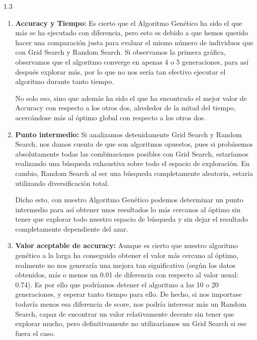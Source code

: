 \documentclass{article}
\begin{document}
\begin{spacing}{1.3}
\begin{enumerate}
  \item \textbf{Accuracy y Tiempo: }Es cierto que el Algoritmo Genético ha sido el que más se ha ejecutado con diferencia,
  pero esto es debido a que hemos querido hacer una comparación justa para evaluar el mismo número de 
  individuos que con Grid Search y Random Search. Si observamos la primera gráfica, observamos que el algoritmo
  converge en apenas 4 o 5 generaciones, para así después explorar más, por lo que no nos sería tan efectivo
  ejecutar el algoritmo durante tanto tiempo.

  No solo eso, sino que además ha sido el que ha encontrado el mejor valor de Accuracy con respecto a los otros dos,
  alrededor de la mitad del tiempo, acercándose más al óptimo global con respecto a los otros dos.\newline

  \item \textbf{Punto intermedio: }Si analizamos detenidamente Grid Search y Random Search, nos damos cuenta de que 
  son algoritmos opuestos, pues si probásemos absolutamente todas las combinaciones posibles con Grid Search, estaríamos
  realizando una búsqueda exhaustiva sobre todo el espacio de exploración. En cambio, Random Search al ser una búsqueda 
  completamente aleatoria, estaría utilizando diversificación total.

  Dicho esto, con nuestro Algoritmo Genético podemos determinar un punto intermedio para así obtener unos resultados lo 
  más cercanos al óptimo sin tener que explorar todo nuestro espacio de búsqueda y sin dejar el resultado completamente 
  dependiente del azar.\newline

  \item \textbf{Valor aceptable de accuracy: }Aunque es cierto que nuestro algoritmo genético a la larga ha conseguido obtener
  el valor más cercano al óptimo, realmente no nos generaría una mejora tan significativa (según los datos obtenidos, más o menos 
  un 0.01 de diferencia con respecto al valor usual: 0.74). Es por ello que podríamos detener el algoritmo
  a las 10 o 20 generaciones, y esperar tanto tiempo para ello. De hecho, si nos importase todavía menos esa diferencia de score,
  nos podría interesar más un Random Search, capaz de encontrar un valor relativamente decente sin tener que explorar mucho, pero 
  definitivamente no utilizaríamos un Grid Search si ese fuera el caso.
\end{enumerate}

\end{spacing}
\end{document}
